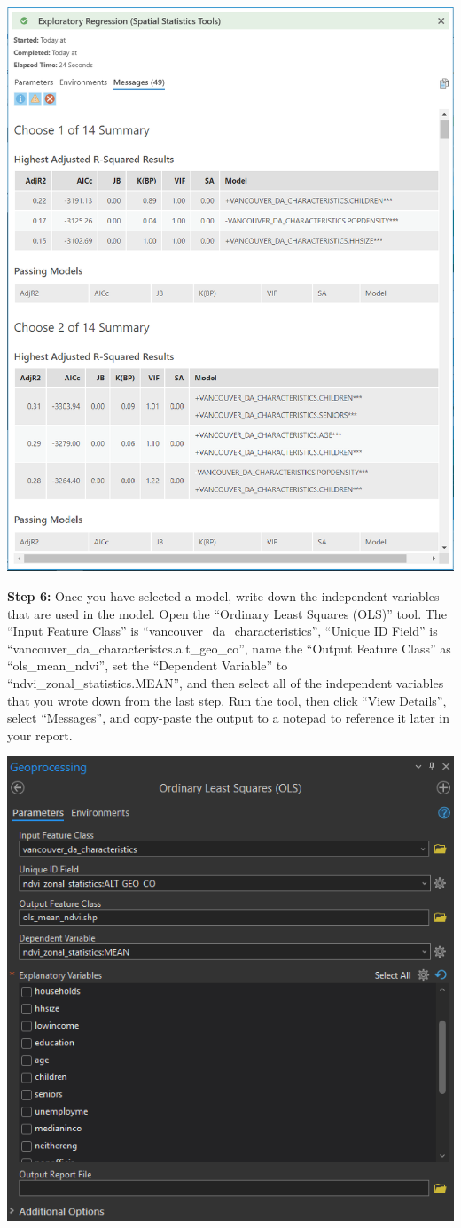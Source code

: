 \documentclass[
]{book}
\begin{document}
\includegraphics[width=1\linewidth]{images/06-arcgis-exploratory-regression-results}

\textbf{Step 6:} Once you have selected a model, write down the independent variables that are used in the model. Open the ``Ordinary Least Squares (OLS)'' tool. The ``Input Feature Class'' is ``vancouver\_da\_characteristics'', ``Unique ID Field'' is ``vancouver\_da\_characteristcs.alt\_geo\_co'', name the ``Output Feature Class'' as ``ols\_mean\_ndvi'', set the ``Dependent Variable'' to ``ndvi\_zonal\_statistics.MEAN'', and then select all of the independent variables that you wrote down from the last step. Run the tool, then click ``View Details'', select ``Messages'', and copy-paste the output to a notepad to reference it later in your report.

\includegraphics[width=0.5\linewidth]{images/06-arcgis-ols}
\end{document}
